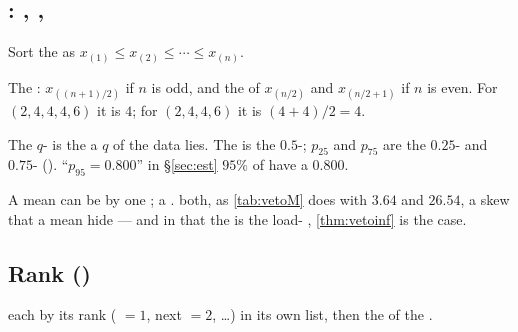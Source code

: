 \subsection{ : , , }

Sort the  as $x_{(1)}\le x_{(2)}\le\cdots\le x_{(n)}$.

\begin{definition}[Median]
The  : $x_{((n+1)/2)}$ if $n$ is odd, and the  of
$x_{(n/2)}$ and $x_{(n/2+1)}$ if $n$ is even. For $(2,4,4,4,6)$ it is $4$; for
$(2,4,4,6)$ it is $(4+4)/2=4$.
\end{definition}

\begin{definition}[Quantile]
The $q$- is the    a  $q$ of the data lies. The
 is the $0.5$-; $p_{25}$ and $p_{75}$ are the $0.25$- and
$0.75$- (\emph{}). ``$p_{95}=0.800$'' in §\ref{sec:est} 
$95\%$ of  have a    $0.800$.
\end{definition}

\begin{remark}
A mean can be   by one  ; a  . 
both, as \cref{tab:vetoM} does with  $3.64$ and  $26.54$,  a
skew that a mean   hide --- and in that  the \emph{} is the
load- ,  \cref{thm:vetoinf} is  the  case.
\end{remark}

\subsection{Rank  ()}

\begin{definition}
 each  by its rank ( $=1$, next $=2$, \dots) in its own list,
then  the   of the .
\end{definition}


